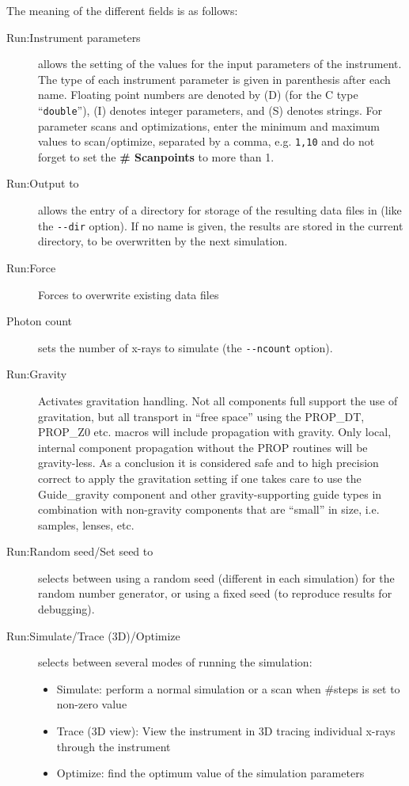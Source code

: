 The meaning of the different fields is as follows:
\begin{description}
\item[Run:Instrument parameters] allows the setting of the values for the input
  parameters of the instrument. The type of each instrument parameter is given
  in parenthesis after each name. Floating point numbers are denoted by (D) (for
  the C type ``\verb+double+''), (I) denotes integer parameters, and (S) denotes
  strings. For parameter scans and optimizations, enter the minimum and maximum
  values to scan/optimize, separated by a comma, e.g. \verb+1,10+ and do not
  forget to set the \textbf{\# Scanpoints} to more than 1.
\item[Run:Output to] allows the entry of a directory for storage of the
  resulting data files in (like the \verb+--dir+ option). If no name is given,
  the results are stored in the current directory, to be overwritten by the next
  simulation.
\item[Run:Force] Forces \MCX to overwrite existing data files
\item[Photon count] sets the number of x-rays to
  simulate (the \verb+--ncount+ option).
\item[Run:Gravity] Activates gravitation handling. Not all components full
  support the use of gravitation, but all transport in ``free space'' using the
  PROP\_DT, PROP\_Z0 etc. macros will include propagation with gravity. Only
  local, internal component propagation without the PROP routines will be
  gravity-less. As a conclusion it is considered safe and to high precision
  correct to apply the gravitation setting if one takes care to use the
  Guide\_gravity component and other gravity-supporting guide types in
  combination with non-gravity components that are ``small'' in size,
  i.e. samples, lenses, etc.
\item[Run:Random seed/Set seed to] selects between using a random seed (different
  in each simulation) for the random number generator, or using a fixed
  seed (to reproduce results for debugging).
\item[Run:Simulate/Trace (3D)/Optimize] selects between several modes of
  running the simulation:
  \begin{itemize}
  \item Simulate: perform a normal simulation or a scan when \#steps
    is set to non-zero value
  \item Trace (3D view): View the instrument in 3D tracing individual
    x-rays through the instrument
  \item Optimize: find the optimum value of the simulation parameters

\end{itemize}
\end{description}
